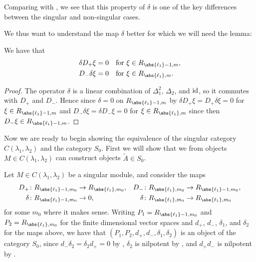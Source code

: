 \begin{remark}
  Comparing  with , we see that this property of $\delta$ is one of the key differences between the singular and non-singular cases.
\end{remark}

We thus want to understand the map $\delta$ better for which we will need the lemma:

\begin{lemma}\label{lem:deltaDszero}
  We have that
  \begin{align}
    \begin{aligned}
      \delta D_+ \xi &= 0 && \text{for }\xi\in R_{\abs{\ell_1}-1,m},\\
      D_-\delta \xi &= 0 && \text{for }\xi\in R_{\abs{\ell_1},m}.
    \end{aligned}
  \end{align}
\end{lemma}
\begin{proof}
  The operator $\delta$ is a linear combination of $\Delta_1^2$, $\Delta_2$, and $\operatorname{id}$, so it commutes with $D_+$ and $D_-$. Hence since $\delta=0$ on $R_{\abs{\ell_1}-1,m}$ by  $\delta D_+ \xi = D_+\delta \xi = 0$ for $\xi\in R_{\abs{\ell_1}-1,m}$ and $D_-\delta \xi = \delta D_-\xi = 0$ for $\xi \in R_{\abs{\ell_1},m}$ since then $D_-\xi\in R_{\abs{\ell_1}-1,m}$.
\end{proof}

Now we are ready to begin showing the equivalence of the singular category $C(\lambda_1,\lambda_2)$ and the category $S_0$. First we will show that we from objects $M\in C(\lambda_1,\lambda_2)$ can construct objects $\widetilde{A}\in S_0$.

Let $M\in C(\lambda_1,\lambda_2)$ be a singular module, and consider the maps
\begin{align*}
  D_+\colon R_{\abs{\ell_1}-1,m_0} &\to R_{\abs{\ell_1},m_0}, & D_-\colon R_{\abs{\ell_1},m_0}&\to R_{\abs{\ell_1}-1,m_0}, \\
  \delta\colon R_{\abs{\ell_1}-1,m_0} &\to 0, & \delta\colon R_{\abs{\ell_1},m_0} &\to R_{\abs{\ell_1},m_0}
\end{align*}
for some $m_0$ where it makes sense. Writing $P_1=R_{\abs{\ell_1}-1,m_0}$ and $P_2=R_{\abs{\ell_1},m_0}$ for the finite dimensional vector spaces and $d_+$, $d_-$, $\delta_1$, and $\delta_2$ for the maps above, we have that $(P_1,P_2,d_+,d_-,\delta_1,\delta_2)$ is an object of the category $S_0$, since $d_-\delta_2=\delta_2d_+=0$ by , $\delta_2$ is nilpotent by , and $d_+d_-$ is nilpotent by .

